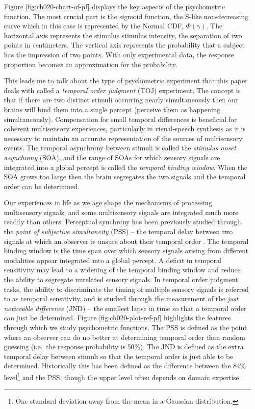 \documentclass[11pt, oneside, openany]{scrbook}
\begin{document}
Figure \ref{fig:ch020-chart-of-pf} displays the key aspects of the psychometric function. The most crucial part is the sigmoid function, the S-like non-decreasing curve which in this case is represented by the Normal CDF, \(\Phi(\gamma)\). The horizontal axis represents the stimulus stimulus intensity, the separation of two points in centimeters. The vertical axis represents the probability that a subject has the impression of two points. With only experimental data, the response proportion becomes an approximation for the probability.

This leads me to talk about the type of psychometric experiment that this paper deals with called a \emph{temporal order judgment} (TOJ) experiment. The concept is that if there are two distinct stimuli occurring nearly simultaneously then our brains will bind them into a single percept (perceive them as happening simultaneously). Compensation for small temporal differences is beneficial for coherent multisensory experiences, particularly in visual-speech synthesis as it is necessary to maintain an accurate representation of the sources of multisensory events. The temporal asynchrony between stimuli is called the \emph{stimulus onset asynchrony} (SOA), and the range of SOAs for which sensory signals are integrated into a global percept is called the \emph{temporal binding window}. When the SOA grows too large then the brain segregates the two signals and the temporal order can be determined.

Our experiences in life as we age shape the mechanisms of processing multisensory signals, and some multisensory signals are integrated much more readily than others. Perceptual synchrony has been previously studied through the \emph{point of subjective simultaneity} (PSS) -- the temporal delay between two signals at which an observer is unsure about their temporal order \citep{stone2001now}. The temporal binding window is the time span over which sensory signals arising from different modalities appear integrated into a global percept. A deficit in temporal sensitivity may lead to a widening of the temporal binding window and reduce the ability to segregate unrelated sensory signals. In temporal order judgment tasks, the ability to discriminate the timing of multiple sensory signals is referred to as temporal sensitivity, and is studied through the measurement of the \emph{just noticeable difference} (JND) -- the smallest lapse in time so that a temporal order can just be determined. Figure \ref{fig:ch020-plot-ref-pf} highlights the features through which we study psychometric functions. The PSS is defined as the point where an observer can do no better at determining temporal order than random guessing (i.e.~the response probability is 50\%). The JND is defined as the extra temporal delay between stimuli so that the temporal order is just able to be determined. Historically this has been defined as the difference between the 84\% level\footnote{One standard deviation away from the mean in a Gaussian distribution.} and the PSS, though the upper level often depends on domain expertise.
\end{document}
